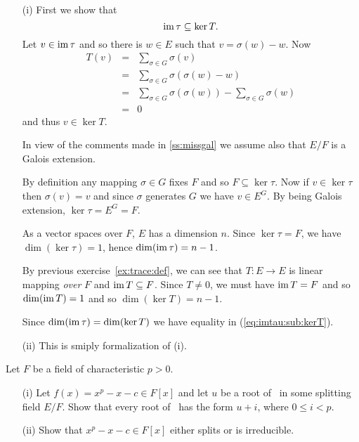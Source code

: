 \begin{myenumerate}
\begin{itemize}
 \item[(i)]
   First we show that
   \begin{equation} \label{eq:imtau:sub:kerT}
   \mathop{\rm im}\nolimits\tau \subseteq \mathop{\rm ker}\nolimits T.
   \end{equation}
   Let \(v \in \mathop{\rm im}\nolimits\tau\) and so there is \(w\in E\) such that
   \(v = \sigma(w) - w\).  Now
   \begin{eqnarray*}
     T(v)
     & = & \sum_{\sigma \in G} \sigma(v) \\
     & = & \sum_{\sigma \in G} \sigma(\sigma(w) - w) \\
     & = & \sum_{\sigma \in G} \sigma(\sigma(w)) -
           \sum_{\sigma \in G} \sigma(w) \\
     & = & 0
   \end{eqnarray*}
   and thus \(v\in \ker T\).

   In view of the comments made in \ref{ss:missgal}
   we assume also that \(E/F\) is a Galois extension.

   By definition any mapping \(\sigma \in G\) fixes $F$
   and so \(F \subseteq \ker \tau\). Now if \(v \in \ker \tau\)
   then \(\sigma(v) = v\) and since \(\sigma\) generates $G$
   we have \(v\in E^G\). By being Galois extension, \(\ker \tau = E^G = F\).

   As a vector spaces over $F$, $E$ has a dimension $n$.
   Since \(\ker \tau =  F\), we have \(\dim(\ker \tau) = 1\), hence
   \(\mathop{\rm dim}\nolimits(\mathop{\rm im}\nolimits \tau) = n - 1\).

   By previous exercise~\ref{ex:trace:def}, we can see that
    \(T: E \rightarrow E\) is linear mapping \emph{over} $F$
   and \(\mathop{\rm im}\nolimits T \subseteq F\). Since \(T \neq 0\), we must have
   \(\mathop{\rm im}\nolimits T = F\) and so \(\mathop{\rm dim}\nolimits(\mathop{\rm im}\nolimits T) = 1\) and so
   \(\dim(\ker T) = n - 1\).

   Since  \(\mathop{\rm dim}\nolimits(\mathop{\rm im}\nolimits \tau) = \mathop{\rm dim}\nolimits(\mathop{\rm ker}\nolimits T)\)
   we have equality in (\ref{eq:imtau:sub:kerT}).

 \item[(ii)]
   This is smiply formalization of (i).
\end{itemize}

\item
\begin{excopy}
Let
\label{ex:xpxc}
$F$ be a field of characteristic \(p>0\).
\begin{itemize}
 \item[(i)]
   Let \(f(x) = x^p - x - c \in F[x]\) and let $u$ be a root of \fx\ in some
   splitting field \(E/F\). Show that every root of \fx\ has the form \(u+i\),
   where \(0 \leq i < p\).
 \item[(ii)]
   Show that \(x^p -x - c \in F[x]\) either splits or is irreducible.
\end{itemize}
\end{excopy}


\end{myenumerate}
